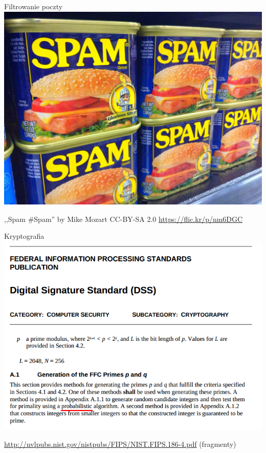 \documentclass{mp}
\subtitle{Zastosowania probabilistyki w informatyce}
\begin{document}
\begin{frame}
\titlepage
\end{frame}

\begin{frame}{Filtrowanie poczty}
\centering\includegraphics[width=.85\textwidth]{spam.jpg}

{\tiny ,,Spam \#Spam'' by Mike Mozart CC-BY-SA 2.0 \url{https://flic.kr/p/nm6DGC}}
\end{frame}
\begin{frame}{Kryptografia}
\centering\includegraphics[width=.85\textwidth]{dsa.png}

{\tiny \url{http://nvlpubs.nist.gov/nistpubs/FIPS/NIST.FIPS.186-4.pdf} (fragmenty)}
\end{frame}
\end{document}
